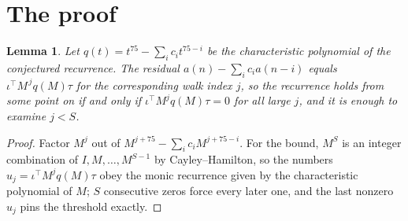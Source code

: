 \documentclass[11pt,a4paper]{article}
\theoremstyle{plain}
\newtheorem{lemma}[theorem]{Lemma}
\theoremstyle{definition}
\begin{document}
\section{The proof}

\begin{lemma}\label{lem:crit}
Let $q(t)=t^{75}-\sum_i c_it^{75-i}$ be the characteristic polynomial of the
conjectured recurrence. The residual $a(n)-\sum_ic_ia(n-i)$ equals
$\iota^{\!\top}M^{\,j}q(M)\tau$ for the corresponding walk index $j$, so the recurrence
holds from some point on if and only if $\iota^{\!\top}M^{j}q(M)\tau=0$ for all large $j$,
and it is enough to examine $j<S$.
\end{lemma}

\begin{proof}
Factor $M^{j}$ out of $M^{j+75}-\sum_ic_iM^{j+75-i}$. For the bound, $M^{S}$
is an integer combination of $I,M,\dots,M^{S-1}$ by Cayley--Hamilton, so the numbers
$u_j=\iota^{\!\top}M^{j}q(M)\tau$ obey the monic recurrence given by the characteristic
polynomial of $M$; $S$ consecutive zeros force every later one, and the last nonzero $u_j$
pins the threshold exactly.
\end{proof}
\end{document}
